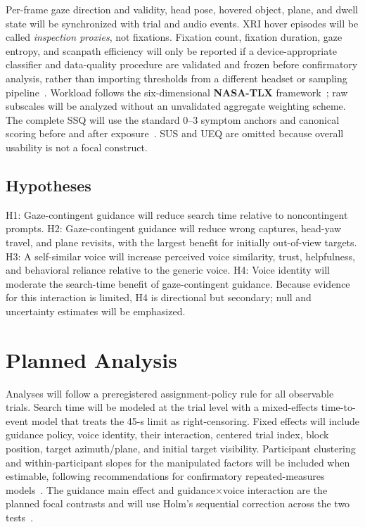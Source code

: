 \documentclass[10pt,journal,compsoc]{IEEEtran}
\begin{document}
Per-frame gaze direction and validity, head pose, hovered object, plane, and dwell state will be synchronized with trial and audio events. XRI hover episodes will be called \emph{inspection proxies}, not fixations. Fixation count, fixation duration, gaze entropy, and scanpath efficiency will only be reported if a device-appropriate classifier and data-quality procedure are validated and frozen before confirmatory analysis, rather than importing thresholds from a different headset or sampling pipeline~\cite{chiossi2024searching}. Workload follows the six-dimensional \textbf{NASA-TLX} framework~\cite{hart1988nasatlx}; raw subscales will be analyzed without an unvalidated aggregate weighting scheme. The complete SSQ will use the standard 0--3 symptom anchors and canonical scoring before and after exposure~\cite{kennedy1993ssq}. SUS and UEQ are omitted because overall usability is not a focal construct.

\subsection{Hypotheses}
H1: Gaze-contingent guidance will reduce search time relative to noncontingent prompts. H2: Gaze-contingent guidance will reduce wrong captures, head-yaw travel, and plane revisits, with the largest benefit for initially out-of-view targets. H3: A self-similar voice will increase perceived voice similarity, trust, helpfulness, and behavioral reliance relative to the generic voice. H4: Voice identity will moderate the search-time benefit of gaze-contingent guidance. Because evidence for this interaction is limited, H4 is directional but secondary; null and uncertainty estimates will be emphasized.

\section{Planned Analysis}
Analyses will follow a preregistered assignment-policy rule for all observable trials. Search time will be modeled at the trial level with a mixed-effects time-to-event model that treats the 45-s limit as right-censoring. Fixed effects will include guidance policy, voice identity, their interaction, centered trial index, block position, target azimuth/plane, and initial target visibility. Participant clustering and within-participant slopes for the manipulated factors will be included when estimable, following recommendations for confirmatory repeated-measures models~\cite{barr2013random}. The guidance main effect and guidance$\times$voice interaction are the planned focal contrasts and will use Holm's sequential correction across the two tests~\cite{holm1979simple}.
\end{document}
